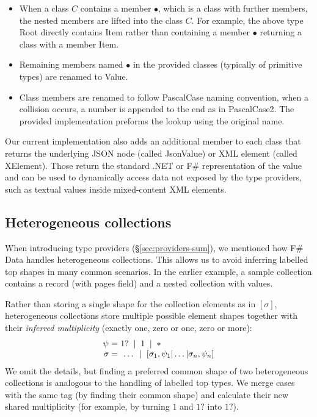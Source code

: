 \documentclass[10pt,nocopyrightspace]{sigplanconf}
\newcommand{\strf}[1]{\textnormal{\textcolor{strclr}{\sffamily #1}}}
\newcommand{\ident}[1]{\textnormal{\sffamily #1}}
\newcommand{\lsep}[0]{\;\; | \;\;}
\newcommand{\narrow}[1]{\hspace{-0.7em} #1 \hspace{-0.7em}}
\begin{document}
\begin{itemize}
\item When a class $C$ contains a member $\bullet$, which is a class with further members, the
  nested members are lifted into the class $C$. For example, the above type \ident{Root}
  directly contains \ident{Item} rather than containing a member $\bullet$ returning a
  class with a member \ident{Item}.

\item Remaining members named $\bullet$ in the provided classes (typically of primitive
  types) are renamed to \ident{Value}.

\item Class members are renamed to follow \ident{PascalCase} naming convention, when a
  collision occurs, a number is appended to the end as in \ident{PascalCase2}. The provided
  implementation preforms the lookup using the original name.
\end{itemize}

Our current implementation also adds an additional member to each class that returns the
underlying JSON node (called \ident{JsonValue}) or XML element (called \ident{XElement}).
Those return the standard .NET or F\# representation of the value and can be used to dynamically
access data not exposed by the type providers, such as textual values inside mixed-content XML elements.


\subsection{Heterogeneous collections}
\label{sec:impl-hetero}

When introducing type providers (\S\ref{sec:providers-sum}), we mentioned how F\# Data
handles heterogeneous collections. This allows us to avoid inferring
labelled top shapes in many common scenarios. In the earlier example, a sample collection
contains a record (with \strf{pages} field) and a nested collection with values.

Rather than storing a single shape for the collection elements as in $[\sigma]$, heterogeneous
collections store multiple possible element shapes together with their \emph{  inferred multiplicity}
(exactly one, zero or one, zero or more):
%
\begin{equation*}
\begin{array}{rcl}
 \psi &\narrow{=}& 1? \lsep 1 \lsep \ast \\
 \sigma &\narrow{=}& ~\ldots \lsep [\sigma_1, \psi_1 | \ldots | \sigma_n, \psi_n ]
\end{array}
\end{equation*}
%
We omit the details, but finding a preferred common shape of two heterogeneous
collections is analogous to the handling of labelled top types. We merge cases with the same tag (by finding
their common shape) and calculate their new shared multiplicity (for example, by turning
$1$ and $1?$ into $1?$).
\end{document}
